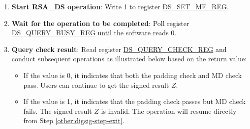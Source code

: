 \documentclass[main\_\_EN.tex]{subfiles}
\begin{document}
\begin{enumerate}
\begin{itemize}
        \item write \begin{math}\widehat{Box}_{i}\end{math}
        (\begin{math}i \in \{ 0, 1, \dots, 11 \} \end{math})
        to \hyperref[DSBOXMEM]{DS\_BOX\_MEM}.

        The capacity of
        \hyperref[DSYMEM]{DS\_Y\_MEM},
        \hyperref[DSMMEM]{DS\_M\_MEM}, and
        \hyperref[DSRBMEM]{DS\_RB\_MEM} is 96 words, whereas the capacity of
        \hyperref[DSBOXMEM]{DS\_BOX\_MEM} is only 12 words.
        Each word can store one base-\begin{math}b\end{math} digit. The memory blocks use the little endian format for storage, i.e., the least significant digit of the operand is in the lowest address.

    \end{itemize}


    \item {\bfseries Start RSA\_DS operation}: Write 1 to register \hyperref[regdesc:DSSETMEREG]{DS\_SET\_ME\_REG}.

    \item {\bfseries Wait for the operation to be completed}: Poll register \hyperref[regdesc:DSQUERYBUSYREG]{DS\_QUERY\_BUSY\_REG} until the software reads 0.

    \item {\bfseries Query check result}: Read register \hyperref[regdesc:DSQUERYCHECKREG]{DS\_QUERY\_CHECK\_REG} and conduct subsequent operations as illustrated below based on the return value:

    \begin{itemize}

        \item If the value is 0, it indicates that both the padding check and MD check pass. Users can continue to get the signed result \begin{math}Z\end{math}.

        \item If the value is 1, it indicates that the padding check passes but MD check fails. The signed result \begin{math}Z\end{math} is invalid. The operation will resume directly from Step \ref{other:digsig-step-exit}.


\end{itemize}
\end{enumerate}
\end{document}
